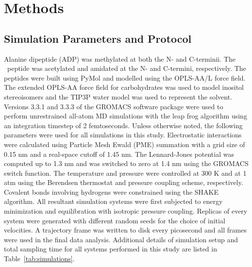 \section{Methods}
\subsection{Simulation Parameters and Protocol}
Alanine dipeptide (ADP) was methylated at both the N- and C-terminii. The \gafour\ peptide was acetylated and amidated at the N- and C-termini, respectively. The peptides were built using PyMol\cite{Anonymous:2012p58} and modelled using the OPLS-AA/L force field\cite{Jorgensen:1996p19}. The extended OPLS-AA force field for carbohydrates\cite{Damm:1997p36} was used to model inositol stereoisomers and the TIP3P water model\cite{Jorgensen:1983p40} was used to represent the solvent. Versions 3.3.1 and 3.3.3 of the GROMACS software package\cite{VanDerSpoel:2005p56} were used to perform unrestrained all-atom MD simulations with the leap frog algorithm using an integration timestep of 2 femtoseconds. Unless otherwise noted, the following parameters were used for all simulations in this study. Electrostatic interactions were calculated using Particle Mesh Ewald (PME) summation with a grid size of 0.15 nm and a real-space cutoff of 1.45 nm.\cite{Essmann:1995p51} The Lennard-Jones potential was computed up to 1.3 nm and was switched to zero at 1.4 nm using the GROMACS switch function. The temperature and pressure were controlled at 300 K and at 1 atm using the Berendsen thermostat and pressure coupling scheme, respectively.\cite{Berendsen:1984p26} Covalent bonds involving hydrogens were constrained using the SHAKE algorithm.\cite{Ryckaert:1977p30} All resultant simulation systems were first subjected to energy minimization and equilibration with isotropic pressure coupling. Replicas of every system were generated with different random seeds for the choice of initial velocities. A trajectory frame was written to disk every picosecond and all frames were used in the final data analysis. Additional details of simulation setup and total sampling time for all systems performed in this study are listed in Table~\ref{tab:simulations}.
	

